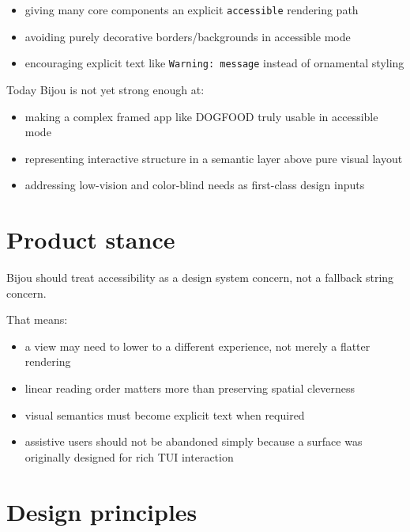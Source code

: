 \begin{itemize}
\tightlist
\item
  giving many core components an explicit \texttt{a\allowbreak{}c\allowbreak{}c\allowbreak{}e\allowbreak{}s\allowbreak{}s\allowbreak{}i\allowbreak{}b\allowbreak{}l\allowbreak{}e} rendering path
\item
  avoiding purely decorative borders/backgrounds in accessible mode
\item
  encouraging explicit text like \texttt{W\allowbreak{}a\allowbreak{}r\allowbreak{}n\allowbreak{}i\allowbreak{}n\allowbreak{}g\allowbreak{}:\allowbreak{} \allowbreak{}m\allowbreak{}e\allowbreak{}s\allowbreak{}s\allowbreak{}a\allowbreak{}g\allowbreak{}e} instead of ornamental styling
\end{itemize}

Today Bijou is not yet strong enough at:

\begin{itemize}
\tightlist
\item
  making a complex framed app like DOGFOOD truly usable in accessible mode
\item
  representing interactive structure in a semantic layer above pure visual layout
\item
  addressing low-vision and color-blind needs as first-class design inputs
\end{itemize}

\section{Product stance}\label{record-032-product-stance}

Bijou should treat accessibility as a design system concern, not a fallback string concern.

That means:

\begin{itemize}
\tightlist
\item
  a view may need to lower to a different experience, not merely a flatter rendering
\item
  linear reading order matters more than preserving spatial cleverness
\item
  visual semantics must become explicit text when required
\item
  assistive users should not be abandoned simply because a surface was originally designed for rich TUI interaction
\end{itemize}

\section{Design principles}\label{record-032-design-principles}

